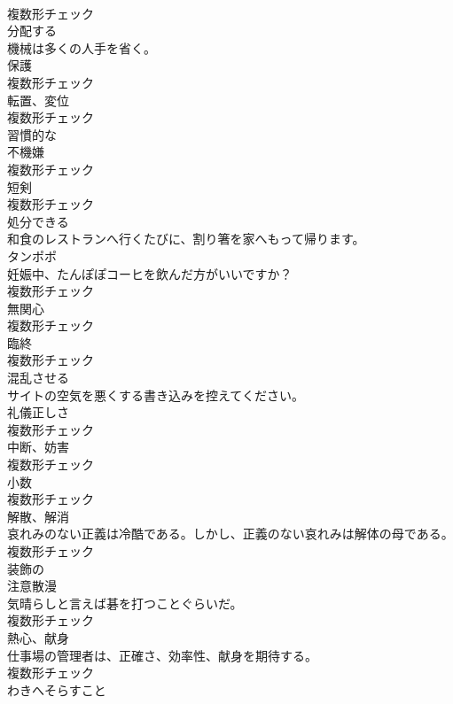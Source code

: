 \documentclass[8pt]{extreport}
\begin{document}
\begin{CJK}{UTF8}{min}
\\	複数形チェック
\\	[動詞]	分配する	
\\	機械は多くの人手を省く。	
\\	[名詞]	保護	
\\	複数形チェック
\\	[名詞]	転置、変位	
\\	複数形チェック
\\	[形容詞]	習慣的な	
\\	[名詞]	不機嫌	
\\	複数形チェック
\\	[名詞]	短剣	
\\	複数形チェック
\\	[形容詞]	処分できる	
\\	和食のレストランへ行くたびに、割り箸を家へもって帰ります。	
\\	[名詞]	タンポポ	
\\	妊娠中、たんぽぽコーヒを飲んだ方がいいですか？	
\\	複数形チェック
\\	[名詞]	無関心	
\\	複数形チェック
\\	[名詞]	臨終	
\\	複数形チェック
\\	[動詞]	混乱させる	
\\	サイトの空気を悪くする書き込みを控えてください。	
\\	[名詞]	礼儀正しさ	
\\	複数形チェック
\\	[名詞]	中断、妨害	
\\	複数形チェック
\\	[名詞]	小数	
\\	複数形チェック
\\	[名詞]	解散、解消	
\\	哀れみのない正義は冷酷である。しかし、正義のない哀れみは解体の母である。	
\\	複数形チェック
\\	[形容詞]	装飾の	
\\	[名詞]	注意散漫	
\\	気晴らしと言えば碁を打つことぐらいだ。	
\\	複数形チェック
\\	[名詞]	熱心、献身	
\\	仕事場の管理者は、正確さ、効率性、献身を期待する。	
\\	複数形チェック
\\	[名詞]	わきへそらすこと	

\end{CJK}
\end{document}
